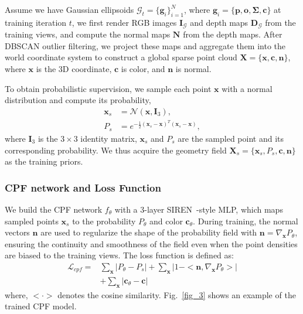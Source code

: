 \documentclass[lettersize,journal]{IEEEtran}
\begin{document}
Assume we have Gaussian ellipsoids 
$\mathcal{G}_t = \{\mathbf{g}_i\}_{i=1}^N$, where $\mathbf{g}_i = \{ \mathbf{p}, \mathbf{o}, \mathbf{\Sigma}, \mathbf{c} \}$ 
at training iteration $t$, we first render RGB images $\mathbf{I}_{\mathcal{G}}$ and depth maps $\mathbf{D}_{\mathcal{G}}$ from the training views, and compute the normal maps $\mathbf{N}$ from the depth maps. 
After DBSCAN outlier filtering, 
we project these maps and aggregate them into the world coordinate system to construct a global sparse point cloud $\mathbf{X} = \{ \mathbf{x}, \mathbf{c}, \mathbf{n} \}$, where $\mathbf{x}$ is the 3D coordinate, $\mathbf{c}$ is color, and $\mathbf{n}$ is normal.

To obtain probabilistic supervision, we sample each point $\mathbf{x}$ with a normal distribution and compute its probability,
\begin{align}
    \mathbf{x}_{s} &= \mathcal{N}(\mathbf{x}, \mathbf{I}_3) \label{eq19}, \\
    P_{s} &= e^{-\frac{1}{2} \left( \mathbf{x}_{s} - \mathbf{x} \right)^{T} \left( \mathbf{x}_{s} - \mathbf{x} \right)}, \label{eq20}
\end{align}
where $\mathbf{I}_3$ is the $3\times3$ identity matrix, $\mathbf{x}_{s}$ and $P_{s}$ are the sampled point and its corresponding probability. We thus acquire the geometry field $\mathbf{X}_{s} = \{ \mathbf{x}_{s}, P_{s}, \mathbf{c}, \mathbf{n} \}$ as the training priors.

\subsubsection{CPF network and Loss Function}

We build the CPF network $f_{\theta}$ with a 3-layer SIREN~\cite{implicit}-style MLP, which maps sampled points $\mathbf{x}_{s}$ to the probability $P_{\theta}$ and color $\mathbf{c}_{\theta}$.
During training, the normal vectors $\mathbf{n}$ are used to regularize the shape of the probability field with $\mathbf{n} = \nabla_{\mathbf{x}} P_{\theta}$, ensuring the continuity and smoothness of the field even when the point densities are biased to the training views. The loss function is defined as:
\begin{equation}
    \begin{aligned}
    \mathcal{L}_{cpf} = &\sum_{\mathbf{x}} \vert P_{\theta} - P_{s} \vert + \sum_{\mathbf{x}}  \vert 1 - <\mathbf{n}, \nabla_{\mathbf{x}} P_{\theta}> \vert \\
    &+ \sum_{\mathbf{x}} \vert \mathbf{c}_{\theta} - \mathbf{c} \vert
    \end{aligned}
    \label{eq21}
\end{equation}
where, $<\cdot>$ denotes the cosine similarity. Fig.~\ref{fig_3} shows an example of the trained CPF model.
\end{document}
